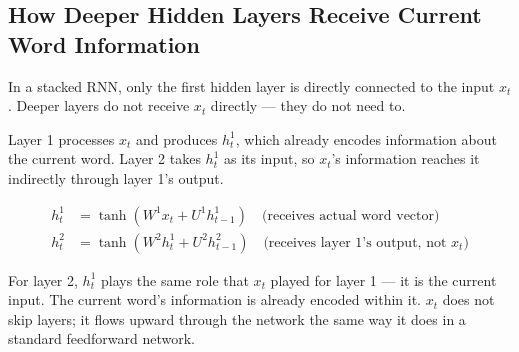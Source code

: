 \subsection{How Deeper Hidden Layers Receive Current Word Information}
In a stacked RNN, only the first hidden layer is directly connected to the input $x_t$. Deeper layers do not receive $x_t$ directly --- they do not need to.

Layer 1 processes $x_t$ and produces $h^1_t$, which already encodes information about the current word. Layer 2 takes $h^1_t$ as its input, so $x_t$'s information reaches it indirectly through layer 1's output.

\begin{align*}
    h^1_t &= \tanh\!\left(W^1 x_t   + U^1 h^1_{t-1}\right) \quad \text{(receives actual word vector)} \\
    h^2_t &= \tanh\!\left(W^2 h^1_t + U^2 h^2_{t-1}\right) \quad \text{(receives layer 1's output, not } x_t\text{)}
\end{align*}

For layer 2, $h^1_t$ plays the same role that $x_t$ played for layer 1 --- it is the current input. The current word's information is already encoded within it. $x_t$ does not skip layers; it flows upward through the network the same way it does in a standard feedforward network.

